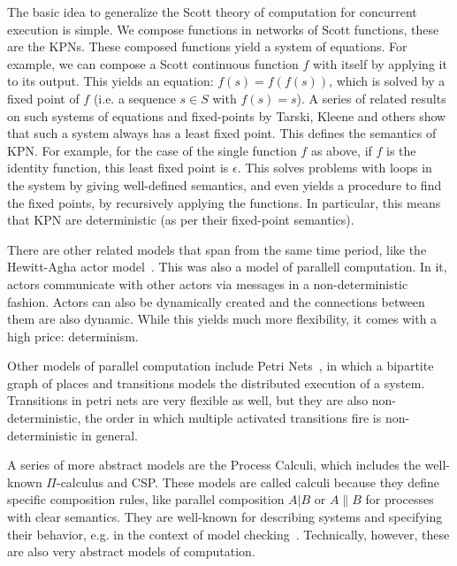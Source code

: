 The basic idea to generalize the Scott theory of computation for concurrent execution is simple.
We compose functions in networks of Scott functions, these are the \acp{KPN}.
These composed functions yield a system of equations.
For example, we can compose a Scott continuous function $f$ with itself by applying it to its output.
This yields an equation: $f(s) = f(f(s))$, which is solved by a fixed point of $f$ (i.e. a sequence $s \in S$ with $f(s)= s$).
A series of related results on such systems of equations and fixed-points by Tarski, Kleene and others show that such a system always has a least fixed point.
This defines the semantics of \ac{KPN}.
For example, for the case of the single function $f$ as above, if $f$ is the identity function, this least fixed point is $\epsilon$.
This solves problems with loops in the system by giving well-defined semantics, and even yields a procedure to find the fixed points, by recursively applying the functions.
In particular, this means that \ac{KPN} are deterministic (as per their fixed-point semantics).

There are other related models that span from the same time period, like the Hewitt-Agha actor model~\cite{DBLP:conf/ijcai/HewittBS73,Agha:86:Actors}.
This was also a model of parallell computation. In it, actors communicate with other actors via messages in a non-deterministic fashion. 
Actors can also be dynamically created and the connections between them are also dynamic.
While this yields much more flexibility, it comes with a high price: determinism. 

Other models of parallel computation include Petri Nets~\cite{petri1962nets}, in which a bipartite graph of places and transitions models the distributed execution of a system.
Transitions in petri nets are very flexible as well, but they are also non-deterministic, the order in which multiple activated transitions fire is non-deterministic in general.

A series of more abstract models are the Process Calculi, which includes the well-known $\Pi$-calculus and \ac{CSP}.
These models are called calculi because they define specific composition rules, like parallel composition $A | B$ or $A \| B$ for processes with clear semantics. 
They are well-known for describing systems and specifying their behavior, e.g. in the context of model checking~\cite{baier_model_checking}.
Technically, however, these are also very abstract models of computation.

